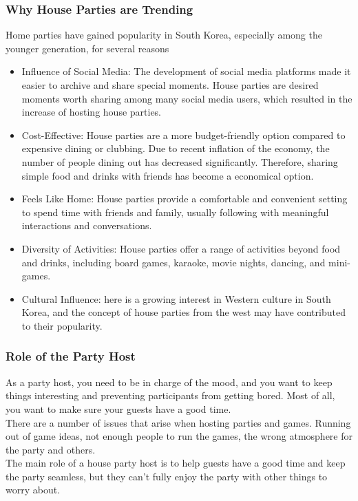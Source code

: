 \documentclass[conference]{IEEEtran}
\begin{document}
        \subsubsection{Why House Parties are Trending}
        
        Home parties have gained popularity in South Korea, especially among the younger generation, for several reasons
        \begin{itemize}
            \item Influence of Social Media: The development of social media platforms made it easier to archive and share special moments. House parties are desired moments worth sharing among many social media users, which resulted in the increase of hosting house parties.
            \item Cost-Effective: House parties are a more budget-friendly option compared to expensive dining or clubbing. Due to recent inflation of the economy, the number of people dining out has decreased significantly. Therefore, sharing simple food and drinks with friends has become a economical option.
            \item Feels Like Home: House parties provide a comfortable and convenient setting to spend time with friends and family, usually following with meaningful interactions and conversations.
            \item Diversity of Activities: House parties offer a range of activities beyond food and drinks, including board games, karaoke, movie nights, dancing, and mini-games.
            \item Cultural Influence: here is a growing interest in Western culture in South Korea, and the concept of house parties from the west may have contributed to their popularity.
        \end{itemize}
        
        \subsubsection{Role of the Party Host}
        As a party host, you need to be in charge of the mood, and you want to keep things interesting and preventing participants from getting bored. Most of all, you want to make sure your guests have a good time.\\
        There are a number of issues that arise when hosting parties and games. Running out of game ideas, not enough people to run the games, the wrong atmosphere for the party and others.\\
        The main role of a house party host is to help guests have a good time and keep the party seamless, but they can't fully enjoy the party with other things to worry about.
\end{document}
